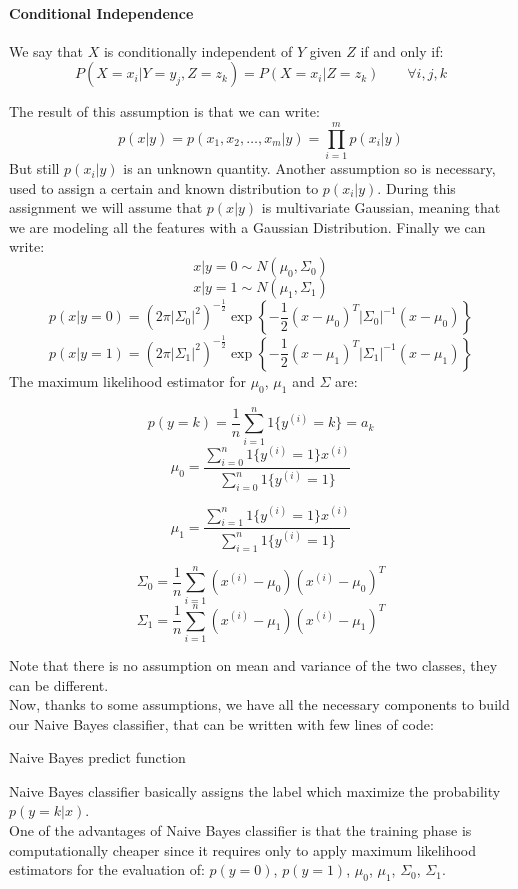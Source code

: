 \documentclass[11pt,a4paper]{article}
\begin{document}
\paragraph{Conditional Independence} We say that $X$ is conditionally independent of $Y$ given $Z$ if and only if:
$$P(X = x_{i} | Y = y_{j}, Z = z_k) = P(X = x_{i}| Z = z_k)\qquad \forall i,j,k$$

The result of this assumption is that we can write:
$$p(x|y) = p(x_1,x_2, \dots, x_m|y) = \prod_{i = 1}^{m}p(x_i|y)$$
But still $p(x_i|y)$ is an unknown quantity. Another assumption so is necessary, used to assign a certain and known distribution to $p(x_i|y)$. During this assignment 
we will assume that $p(x|y)$ is multivariate Gaussian, meaning that we are modeling all the features with a Gaussian Distribution. Finally we can write:
$$x|y = 0 \sim N(\mu_0, \Sigma_{0})$$
$$x|y = 1 \sim N(\mu_1, \Sigma_{1})$$
$$ p(x| y = 0) =  (2\pi|\Sigma_0|^2)^{-\frac{1}{2}} \exp\left\{-\frac{1}{2}(x - \mu_{0})^T |\Sigma_0|^{-1} (x - \mu_{0})\right\}$$
$$ p(x| y = 1) =  (2\pi|\Sigma_1|^2)^{-\frac{1}{2}} \exp\left\{-\frac{1}{2}(x - \mu_{1})^T |\Sigma_1|^{-1} (x - \mu_{1})\right\}$$
The maximum likelihood estimator for $\mu_0$, $\mu_1$ and $\Sigma$ are:

$$p(y = k) = \frac{1}{n}\sum_{i=1}^n 1\{y^{(i)} = k\}= a_k$$
$$\mu_0 = \frac{\sum_{i = 0}^{n}1\{y^{(i)} =1\}x^{(i)}}{\sum_{i=0}^{n}1\{y^{(i)} =1\}}$$

$$\mu_1 = \frac{\sum_{i = 1}^{n}1\{y^{(i)} =1\}x^{(i)}}{\sum_{i = 1}^{n}1\{y^{(i)} =1\}}$$


$$\Sigma_0 = \frac{1}{n} \sum_{i = 1}^{n}(x^{(i)}-\mu_0)(x^{(i)}-\mu_0)^T$$
$$\Sigma_1 = \frac{1}{n} \sum_{i = 1}^{n}(x^{(i)}-\mu_1)(x^{(i)}-\mu_1)^T$$

Note that there is no assumption on mean and variance of the two classes, they can be different.\\
Now, thanks to some assumptions, we have all the necessary components to build our Naive Bayes classifier, that can be written with few lines of code:
\begin{algorithm}
	\caption{Naive Bayes predict function}
	\begin{algorithmic}[1]
		\State {}
		\Else 
		\State {}
		\EndIf
		\EndProcedure
	\end{algorithmic}
\end{algorithm}

Naive Bayes classifier basically assigns the label which maximize the probability $p(y = k | x)$.\\
One of the advantages of Naive Bayes classifier is that the training phase is computationally cheaper since it requires only to apply maximum likelihood estimators for the evaluation of: $p(y = 0)$, $p(y = 1)$, $\mu_0$, $\mu_1$, $\Sigma_0$, $\Sigma_1$.
\end{document}
